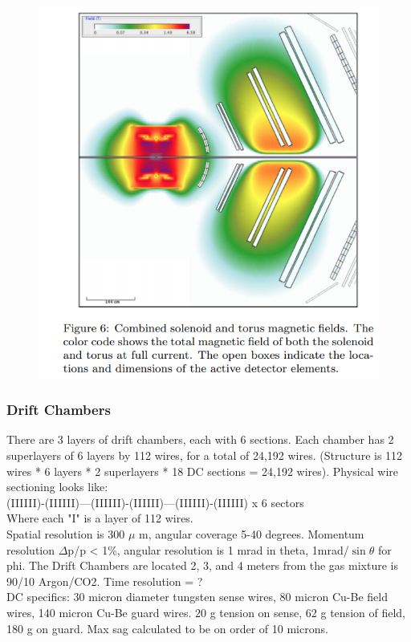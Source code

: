			 \begin{figure}[H]
    			\centering
    			\includegraphics[width=12cm]{Chapters/Ch2-Experiment/clas-12-system/pics/fd/torus.PNG}
			\end{figure}
                        

        
        \subsubsection{Drift Chambers}
            There are 3 layers of drift chambers, each with 6 sections. Each chamber has 2 superlayers of 6 layers by 112 wires, for a total of 24,192 wires. (Structure is 112 wires * 6 layers * 2 superlayers * 18 DC sections = 24,192 wires). Physical wire sectioning looks like:\\
            (IIIIII)-(IIIIII)---(IIIIII)-(IIIIII)---(IIIIII)-(IIIIII) x 6 sectors\\
            Where each "I" is a layer of 112 wires.\\
            Spatial resolution is 300 $\mu$ m, angular coverage 5-40 degrees. Momentum resolution $\Delta$p/p < 1\%, angular resolution is 1 mrad in theta, 1mrad/$\sin{\theta}$ for phi. The Drift Chambers are located 2, 3, and 4 meters from the gas mixture is 90/10 Argon/CO2. Time resolution = ?\\
            DC specifics: 30 micron diameter tungsten sense wires, 80 micron Cu-Be field wires, 140 micron Cu-Be guard wires. 20 g tension on sense, 62 g tension of field, 180 g on guard. Max sag calculated to be on order of 10 microns.
            
